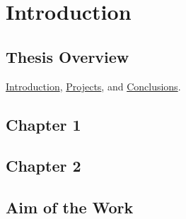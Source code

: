 \part{Introduction\label{part:introduction}}


\chapter{Thesis Overview\label{ch:thesis_overview}}
    \lipsum[1]
    \hyperref[part:introduction]{Introduction}, \hyperref[part:projects]{Projects}, and \hyperref[part:conclusions]{Conclusions}.\\

\chapter{Chapter 1\label{ch:chapter 1}}
    \lipsum[1-10]

\chapter{Chapter 2\label{ch:chapter 2}}
    \lipsum[1-10]

\chapter{Aim of the Work\label{ch:aim}}
    \lipsum[1]

